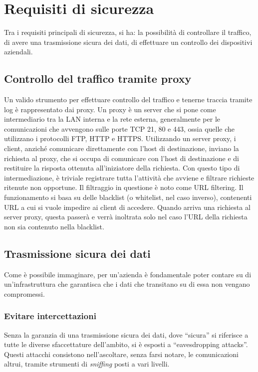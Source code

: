 \section{Requisiti di sicurezza}
Tra i requisiti principali di sicurezza, si ha: la possibilità di controllare il traffico, di avere una trasmissione sicura dei dati, di effettuare un controllo dei dispositivi aziendali.

\subsection{Controllo del traffico tramite proxy}
Un valido strumento per effettuare controllo del traffico e tenerne traccia tramite log è rappresentato dai proxy.
Un proxy è un server che si pone come intermediario tra la LAN interna e la rete esterna, generalmente per le comunicazioni che avvengono sulle porte TCP 21, 80 e 443, ossia quelle che utilizzano i protocolli FTP, HTTP e HTTPS.
Utilizzando un server proxy, i client, anziché comunicare direttamente con l'host di destinazione, inviano la richiesta al proxy, che si occupa di comunicare con l'host di destinazione e di restituire la risposta ottenuta all'iniziatore della richiesta.
Con questo tipo di intermediazione, è triviale registrare tutta l'attività che avviene e filtrare richieste ritenute non opportune.
Il filtraggio in questione è noto come URL filtering. Il funzionamento si basa su delle blacklist (o whitelist, nel caso inverso), contenenti URL a cui si vuole impedire ai client di accedere. Quando arriva una richiesta al server proxy, questa passerà e verrà inoltrata solo nel caso l'URL della richiesta non sia contenuto nella blacklist.

\subsection{Trasmissione sicura dei dati}
Come è possibile immaginare, per un'azienda è fondamentale poter contare su di un'infrastruttura che garantisca che i dati che transitano su di essa non vengano compromessi.

\subsubsection{Evitare intercettazioni}
Senza la garanzia di una trasmissione sicura dei dati, dove ``sicura'' si riferisce a tutte le diverse sfaccettature dell'ambito, si è esposti a ``eavesdropping attacks''. Questi attacchi consistono nell'ascoltare, senza farsi notare, le comunicazioni altrui, tramite strumenti di \emph{sniffing} posti a vari livelli.

